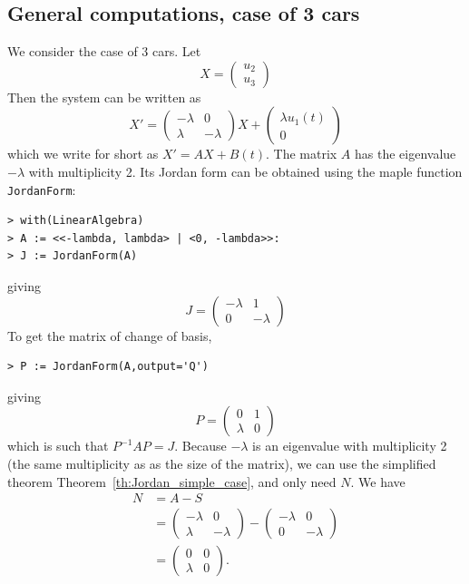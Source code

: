 \subsection{General computations, case of 3 cars}
We consider the case of 3 cars. Let
\[
X=\begin{pmatrix}
u_2\\ u_3
\end{pmatrix}
\]
Then the system can be written as
\[
X'=\begin{pmatrix}
-\lambda & 0 \\
\lambda & -\lambda
\end{pmatrix}X
+\begin{pmatrix}
\lambda u_1(t)\\ 0
\end{pmatrix}
\]
which we write for short as $X'=AX+B(t)$.
The matrix $A$ has the eigenvalue $-\lambda$ with multiplicity 2. Its Jordan form can be obtained using the maple function {\tt JordanForm}:
\begin{verbatim}
> with(LinearAlgebra)
> A := <<-lambda, lambda> | <0, -lambda>>:
> J := JordanForm(A)
\end{verbatim}
giving
\[
J=\begin{pmatrix}
-\lambda & 1 \\
0 & -\lambda
\end{pmatrix}
\]
To get the matrix of change of basis, 
\begin{verbatim}
> P := JordanForm(A,output='Q')
\end{verbatim}
giving
\[
P=\begin{pmatrix}
0 & 1 \\
\lambda & 0
\end{pmatrix}
\]
which is such that $P^{-1}AP=J$.
Because $-\lambda$ is an eigenvalue with multiplicity 2 (the same multiplicity as as the size of the matrix), we can use the simplified theorem Theorem~\ref{th:Jordan_simple_case}, and only need $N$. 
We have
\begin{align*}
N &= A-S \\
&=\begin{pmatrix}
-\lambda & 0 \\
\lambda & -\lambda
\end{pmatrix}
-
\begin{pmatrix}
-\lambda & 0 \\
0 & -\lambda
\end{pmatrix} \\
&=\begin{pmatrix}
0 & 0 \\
\lambda & 0
\end{pmatrix}.
\end{align*}
